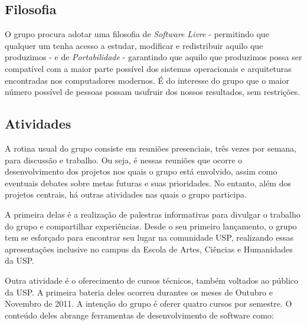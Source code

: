 \documentclass[12pt,onecolumn,a4paper]{article}
\begin{document}
    \clearpage
    \subsection{Filosofia}
    \label{src:filosofia}
        O grupo procura adotar uma filosofia de {\it Software Livre} - permitindo que qualquer um
        tenha acesso a estudar, modificar e redistribuir aquilo que produzimos - e de {\it
        Portabilidade} - garantindo que aquilo que produzimos possa ser compatível com a maior parte
        possível dos sistemas operacionais e arquiteturas encontradas nos computadores modernos. É
        do interesse do grupo que o maior número possível de pessoas possam usufruir dos nossos
        resultados, sem restrições.
    
    \clearpage
    \subsection{Atividades}
    \label{sec:atividades}
        A rotina usual do grupo consiste em reuniões presenciais, três vezes por semana, para
        discussão e trabalho. Ou seja, é nessas reuniões que ocorre o desenvolvimento dos projetos
        nos quais o grupo está envolvido, assim como eventuais debates sobre metas futuras e suas
        prioridades. No entanto, além dos projetos centrais, há outras atividades nas quais o grupo
        participa.
        
        A primeira delas é a realização de palestras informativas para divulgar o trabalho do grupo
        e compartilhar experiências. Desde o seu primeiro lançamento, o grupo tem se esforçado para
        encontrar seu lugar na comunidade USP, realizando essas apresentações inclusive no campus da
        Escola de Artes, Ciências e Humanidades da USP.
        
        Outra atividade é o oferecimento de cursos técnicos, também voltados ao público da USP. A
        primeira bateria deles ocorreu durantes os meses de Outubro e Novembro de 2011. A intenção
        do grupo é oferer quatro cursos por semestre. O conteúdo deles abrange ferramentas de
        desenvolvimento de software como:
\end{document}
